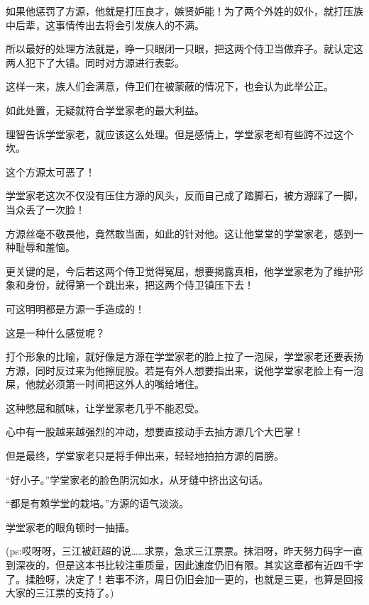 \begin{this_body}
如果他惩罚了方源，他就是打压良才，嫉贤妒能！为了两个外姓的奴仆，就打压族中后辈，这事情传出去将会引发族人的不满。

所以最好的处理方法就是，睁一只眼闭一只眼，把这两个侍卫当做弃子。就认定这两人犯下了大错。同时对方源进行表彰。

这样一来，族人们会满意，侍卫们在被蒙蔽的情况下，也会认为此举公正。

如此处置，无疑就符合学堂家老的最大利益。

理智告诉学堂家老，就应该这么处理。但是感情上，学堂家老却有些跨不过这个坎。

这个方源太可恶了！

学堂家老这次不仅没有压住方源的风头，反而自己成了踏脚石，被方源踩了一脚，当众丢了一次脸！

方源丝毫不敬畏他，竟然敢当面，如此的针对他。这让他堂堂的学堂家老，感到一种耻辱和羞恼。

更关键的是，今后若这两个侍卫觉得冤屈，想要揭露真相，他学堂家老为了维护形象和身份，就得第一个跳出来，把这两个侍卫镇压下去！

可这明明都是方源一手造成的！

这是一种什么感觉呢？

打个形象的比喻，就好像是方源在学堂家老的脸上拉了一泡屎，学堂家老还要表扬方源，同时反过来为他擦屁股。若是有外人想要指出来，说他学堂家老脸上有一泡屎，他就必须第一时间把这外人的嘴给堵住。

这种憋屈和腻味，让学堂家老几乎不能忍受。

心中有一股越来越强烈的冲动，想要直接动手去抽方源几个大巴掌！

但是最终，学堂家老只是将手伸出来，轻轻地拍拍方源的肩膀。

“好小子。”学堂家老的脸色阴沉如水，从牙缝中挤出这句话。

“都是有赖学堂的栽培。”方源的语气淡淡。

学堂家老的眼角顿时一抽搐。

(ps:哎呀呀，三江被赶超的说……求票，急求三江票票。抹泪呀，昨天努力码字一直到深夜的，但是这本书比较注重质量，因此速度仍旧有限。其实这章都有近四千字了。揉脸呀，决定了！若事不济，周日仍旧会加一更的，也就是三更，也算是回报大家的三江票的支持了。)

\end{this_body}

